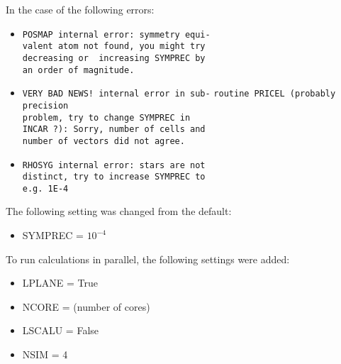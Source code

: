 \documentclass{article}
\begin{document}
\vspace{5mm}
\noindent
In the case of the following errors: 
\begin{itemize}
  \item{
    \verb|POSMAP internal error: symmetry equi-|\\ 
    \verb|valent atom not found, you might try |\\
    \verb|decreasing or  increasing SYMPREC by |\\
    \verb|an order of magnitude.|}
  \item{
    \verb|VERY BAD NEWS! internal error in sub-|
    \verb|routine PRICEL (probably precision |\\
    \verb|problem, try to change SYMPREC in |\\
    \verb|INCAR ?): Sorry, number of cells and |\\
    \verb|number of vectors did not agree.|}
  \item{
    \verb|RHOSYG internal error: stars are not |\\ 
    \verb|distinct, try to increase SYMPREC to |\\
    \verb|e.g. 1E-4|}
\end{itemize}
\noindent
The following setting was changed from the default:
\begin{itemize}
  \item{ SYMPREC = $10^{-4}$ }
\end{itemize}

\vspace{5mm}
\noindent
To run calculations in parallel, the following settings were added: 
\begin{itemize}
  \item{ LPLANE = True }
  \item{ NCORE = (number of cores) }
  \item{ LSCALU = False }
  \item{ NSIM = 4 }
\end{itemize}




\end{document}
